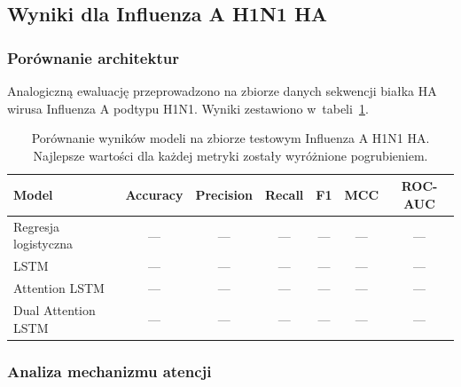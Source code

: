 \subsection{Wyniki dla Influenza A H1N1 HA}
\label{sec:results-influenza}

\subsubsection{Porównanie architektur}

Analogiczną ewaluację przeprowadzono na zbiorze danych sekwencji białka HA wirusa Influenza A podtypu H1N1. Wyniki zestawiono w~tabeli~\ref{tab:results-influenza}.

\begin{table}[H]
    \centering
    \caption{Porównanie wyników modeli na zbiorze testowym Influenza A H1N1 HA. Najlepsze wartości dla każdej metryki zostały wyróżnione pogrubieniem.}
    \label{tab:results-influenza}
    \begin{tabular}{lcccccc}
        \toprule
        \textbf{Model} & \textbf{Accuracy} & \textbf{Precision} & \textbf{Recall} & \textbf{F1} & \textbf{MCC} & \textbf{ROC-AUC} \\
        \midrule
        Regresja logistyczna    & --- & --- & --- & --- & --- & --- \\
        LSTM                    & --- & --- & --- & --- & --- & --- \\
        Attention LSTM          & --- & --- & --- & --- & --- & --- \\
        Dual Attention LSTM     & --- & --- & --- & --- & --- & --- \\
        \bottomrule
    \end{tabular}
\end{table}


\subsubsection{Analiza mechanizmu atencji}


